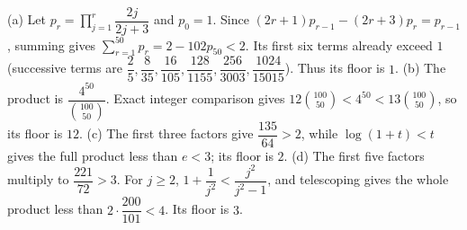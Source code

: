 (a) Let $p_r=\prod_{j=1}^r\dfrac{2j}{2j+3}$ and $p_0=1$. Since $(2r+1)p_{r-1}-(2r+3)p_r=p_{r-1}$, summing gives $\sum_{r=1}^{50}p_r=2-102p_{50}<2$. Its first six terms already exceed $1$ (successive terms are $\dfrac{2}{5} , \dfrac{8}{35} , \dfrac{16}{105} , \dfrac{128}{1155} , \dfrac{256}{3003} , \dfrac{1024}{15015}$). Thus its floor is $1$. (b) The product is $\dfrac{4^{50}}{\binom{100}{50}}$. Exact integer comparison gives $12\binom{100}{50}<4^{50}<13\binom{100}{50}$, so its floor is $12$. (c) The first three factors give $\dfrac{135}{64} > 2$, while $\log(1+t)<t$ gives the full product less than $e<3$; its floor is $2$. (d) The first five factors multiply to $\dfrac{221}{72} > 3$. For $j\ge2$, $1 + \dfrac{1}{j^2} < \dfrac{j^2}{j^2-1}$, and telescoping gives the whole product less than $2 \cdot \dfrac{200}{101} < 4$. Its floor is $3$.
